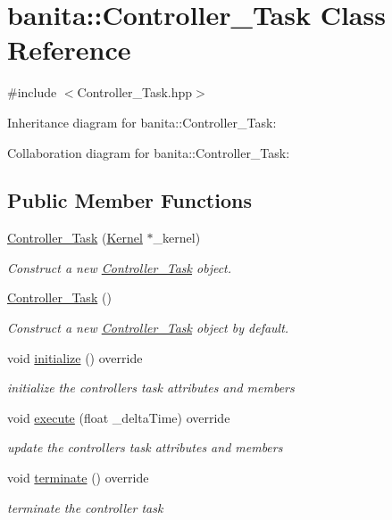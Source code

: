 \hypertarget{classbanita_1_1_controller___task}{}\section{banita\+::Controller\+\_\+\+Task Class Reference}
\label{classbanita_1_1_controller___task}


{\ttfamily \#include $<$Controller\+\_\+\+Task.\+hpp$>$}



Inheritance diagram for banita\+::Controller\+\_\+\+Task\+:


Collaboration diagram for banita\+::Controller\+\_\+\+Task\+:
\subsection*{Public Member Functions}
\begin{DoxyCompactItemize}
\item 
\mbox{\hyperlink{classbanita_1_1_controller___task_a48c10c36d2112473685b6713ae65f26d}{Controller\+\_\+\+Task}} (\mbox{\hyperlink{classbanita_1_1_kernel}{Kernel}} $\ast$\+\_\+kernel)
\begin{DoxyCompactList}\small\item\em Construct a new \mbox{\hyperlink{classbanita_1_1_controller___task}{Controller\+\_\+\+Task}} object. \end{DoxyCompactList}\item 
\mbox{\hyperlink{classbanita_1_1_controller___task_a73f0bda0ad130e8449fe0c4c3d58a31b}{Controller\+\_\+\+Task}} ()
\begin{DoxyCompactList}\small\item\em Construct a new \mbox{\hyperlink{classbanita_1_1_controller___task}{Controller\+\_\+\+Task}} object by default. \end{DoxyCompactList}\item 
void \mbox{\hyperlink{classbanita_1_1_controller___task_a87990651d658eb3d26a9b8526e600fd7}{initialize}} () override
\begin{DoxyCompactList}\small\item\em initialize the controller\textquotesingle{}s task attributes and members \end{DoxyCompactList}\item 
void \mbox{\hyperlink{classbanita_1_1_controller___task_a7391e5e47d43ac832fdff9912e140815}{execute}} (float \+\_\+delta\+Time) override
\begin{DoxyCompactList}\small\item\em update the controller\textquotesingle{}s task attributes and members \end{DoxyCompactList}\item 
void \mbox{\hyperlink{classbanita_1_1_controller___task_a6d1e35ea53bb0dcb64d579937dc7d5f4}{terminate}} () override
\begin{DoxyCompactList}\small\item\em terminate the controller task \end{DoxyCompactList}\end{DoxyCompactItemize}
